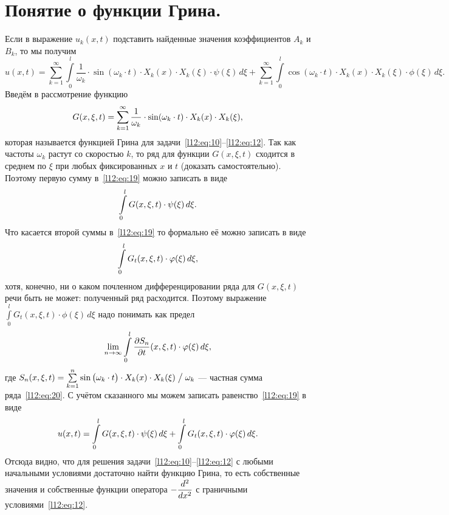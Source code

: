 \section{Понятие о функции Грина.}
\label{lecture11section3}
Если в выражение $u_k(x,t)$ подставить найденные значения коэффициентов $A_k$ и  $B_k$, то мы получим
\begin{equation}
	\label{l12:eq:19}
	u(x,t)=\sum\limits_{k=1}^{\infty}\int\limits_0^l\frac{1}{\omega_k}\cdot\sin(\omega_k\cdot t)\cdot X_k(x)\cdot X_k(\xi)\cdot\psi(\xi)\,d\xi+ \sum\limits_{k=1}^{\infty}\int\limits_0^l\cos(\omega_k\cdot t)\cdot X_k(x)\cdot X_k(\xi)\cdot\phi(\xi)\,d\xi.
\end{equation}
Введём в рассмотрение функцию
\begin{equation}
	\label{l12:eq:20}
	\hfill G(x,\xi,t)=\sum\limits_{k=1}^{\infty}\frac{1}{\omega_k}\cdot\sin(\omega_k\cdot t)\cdot X_k(x)\cdot X_k(\xi),\hfill
\end{equation}
которая называется функцией Грина для задачи~\eqref{l12:eq:10}--\eqref{l12:eq:12}. Так как частоты $\omega_k$ растут со скоростью $k$, то ряд для функции $G(x,\xi,t)$ сходится в среднем по $\xi$ при любых фиксированных $x$ и $t$ (доказать самостоятельно). Поэтому первую сумму в~\eqref{l12:eq:19} можно записать в виде 
\begin{equation*}
	\hfill\int\limits_0^l G(x,\xi,t)\cdot\psi(\xi)\,d\xi.\hfill
\end{equation*}
Что касается второй суммы в~\eqref{l12:eq:19} то формально её можно записать в виде 
\begin{equation*}
	\hfill\int\limits_0^l G_t(x,\xi,t)\cdot\phi(\xi)\,d\xi,\hfill
\end{equation*}
хотя, конечно, ни о каком почленном дифференцировании ряда для $G(x,\xi,t)$ речи быть не может: полученный ряд расходится. Поэтому выражение $\int\limits_0^l G_t(x,\xi,t)\cdot\phi(\xi)\,d\xi$ надо понимать как предел 
\begin{equation*}
	\hfill\lim\limits_{n\to\infty}\int\limits_0^l\pder{S_n}{t}(x,\xi,t)\cdot\phi(\xi)\,d\xi,\hfill
\end{equation*}
где $S_n(x,\xi,t)=\sum\limits_{k=1}^n\sin\big(\omega_k\cdot t\big)\cdot X_k(x)\cdot X_k(\xi)\bigm/\omega_k$ --- частная сумма ряда~\eqref{l12:eq:20}. С учётом сказанного мы можем записать равенство~\eqref{l12:eq:19} в виде
\begin{equation}
	\label{l12:eq:21}
	\hfill u(x,t)=\int\limits_0^l G(x,\xi,t)\cdot\psi(\xi)\,d\xi+\int\limits_0^l G_t(x,\xi,t)\cdot\phi(\xi)\,d\xi.\hfill
\end{equation}
Отсюда видно, что для решения задачи~\eqref{l12:eq:10}--\eqref{l12:eq:12} с любыми начальными условиями достаточно найти функцию Грина, то есть собственные значения и собственные функции оператора $-\displaystyle\frac{d^2}{dx^2}$ с граничными условиями~\eqref{l12:eq:12}.

